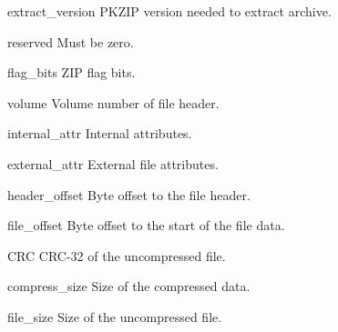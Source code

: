 \begin{memberdesc}[ZipInfo]{extract_version}
  PKZIP version needed to extract archive.
\end{memberdesc}

\begin{memberdesc}[ZipInfo]{reserved}
  Must be zero.
\end{memberdesc}

\begin{memberdesc}[ZipInfo]{flag_bits}
  ZIP flag bits.
\end{memberdesc}

\begin{memberdesc}[ZipInfo]{volume}
  Volume number of file header.
\end{memberdesc}

\begin{memberdesc}[ZipInfo]{internal_attr}
  Internal attributes.
\end{memberdesc}

\begin{memberdesc}[ZipInfo]{external_attr}
 External file attributes.
\end{memberdesc}

\begin{memberdesc}[ZipInfo]{header_offset}
  Byte offset to the file header.
\end{memberdesc}

\begin{memberdesc}[ZipInfo]{file_offset}
  Byte offset to the start of the file data.
\end{memberdesc}

\begin{memberdesc}[ZipInfo]{CRC}
  CRC-32 of the uncompressed file.
\end{memberdesc}

\begin{memberdesc}[ZipInfo]{compress_size}
  Size of the compressed data.
\end{memberdesc}

\begin{memberdesc}[ZipInfo]{file_size}
  Size of the uncompressed file.
\end{memberdesc}
